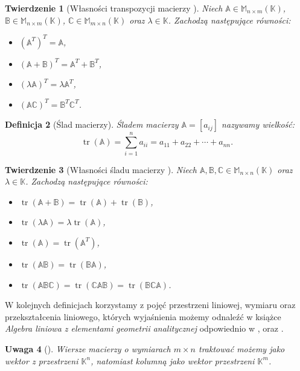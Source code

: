 \documentclass[12pt,a4paper]{report}
\newtheorem{df}{Definicja}[chapter]
\newtheorem{tw}[df]{Twierdzenie}
\newtheorem{uwaga}[df]{Uwaga}
\newcommand{\setK}{\mathbb{K}}
\newcommand{\tr}[1]{\operatorname{tr}\left({#1} \right)}
\begin{document}
\begin{tw}[Własności transpozycji macierzy {\citep[Sec 5.1 Tw. 5.1]{ealIII}}]
Niech $\mathbb{A} \in \mathbb{M}_{n \times m} (\setK)$, $\mathbb{B} \in \mathbb{M}_{n \times m} (\setK)$, $\mathbb{C} \in \mathbb{M}_{m \times n} (\setK)$ oraz $\lambda \in \setK$.
Zachodzą następujące równości:
\begin{itemize}
\item $(\mathbb{A}^T)^T = \mathbb{A}$,
\item $(\mathbb{A} + \mathbb{B})^T = \mathbb{A}^T + \mathbb{B}^T$,
\item $(\lambda \mathbb{A})^T = \lambda \mathbb{A}^T$,
\item $(\mathbb{A}\mathbb{C})^T = \mathbb{B}^T \mathbb{C}^T$.
\end{itemize}
\end{tw}

\begin{df}[Ślad macierzy]{\citep[Sec 6.4]{ealIII}}
Śladem macierzy  $\mathbb{A} = [a_{ij}]$ nazywamy wielkość:
$$
\tr{\mathbb{A}} = \sum_{i=1}^n a_{ii} = a_{11} + a_{22} + \cdots + a_{nn}.
$$
\end{df}


\begin{tw}[Własności śladu macierzy {\citep[Sec 6.4]{ealIII}}]
Niech $\mathbb{A}, \mathbb{B}, \mathbb{C} \in \mathbb{M}_{n \times n} (\setK)$ oraz $\lambda \in \setK$.
Zachodzą następujące równości:
\begin{itemize}
\item $\tr{\mathbb{A} + \mathbb{B}} = \tr{\mathbb{A}} + \tr{\mathbb{B}}$,
\item $\tr{\lambda \mathbb{A}} = \lambda \tr{\mathbb{A}}$,
\item $\tr{\mathbb{A}} =\tr{\mathbb{A}^T}$,
\item $\tr{\mathbb{A} \mathbb{B}}  = \tr{\mathbb{B} \mathbb{A}} $,
\item $\tr{\mathbb{A} \mathbb{B} \mathbb{C}}  = \tr{\mathbb{C} \mathbb{A} \mathbb{B}} = \tr{\mathbb{B} \mathbb{C} \mathbb{A}}$.
\end{itemize}
\end{tw}

W kolejnych definicjach korzystamy z pojęć przestrzeni liniowej, wymiaru oraz przekształcenia liniowego, których wyjaśnienia możemy odnaleźć w książce \textit{Algebra liniowa z elementami geometrii analitycznej} odpowiednio w {\citep[Sec 7.1]{alzega}}, {\citep[Sec 7.5]{alzega}} oraz {\citep[Sec 9.1]{alzega}}.

\begin{uwaga}[{\citep[Sec 8.1]{alzega}}]
Wiersze macierzy o wymiarach $m \times n$ traktować możemy jako wektor z przestrzeni $\setK^n$, natomiast kolumną jako wektor przestrzeni $\setK^m$.
\end{uwaga}
\end{document}
